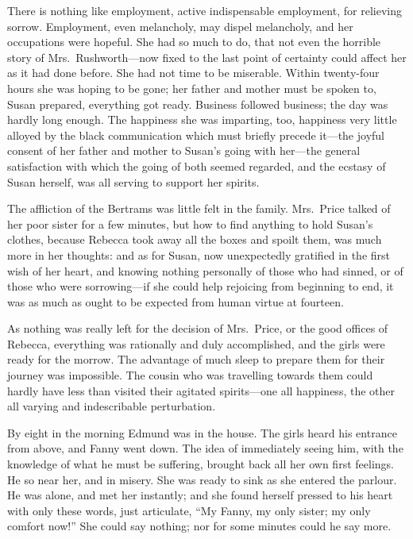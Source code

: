 There is nothing like employment, active indispensable employment,
for relieving sorrow.  Employment, even melancholy,
may dispel melancholy, and her occupations were hopeful.
She had so much to do, that not even the horrible
story of Mrs.\ Rushworth---now fixed to the last point
of certainty could affect her as it had done before.
She had not time to be miserable.  Within twenty-four
hours she was hoping to be gone; her father and mother
must be spoken to, Susan prepared, everything got ready.
Business followed business; the day was hardly long enough.
The happiness she was imparting, too, happiness very little
alloyed by the black communication which must briefly
precede it---the joyful consent of her father and mother
to Susan's going with her---the general satisfaction with
which the going of both seemed regarded, and the ecstasy
of Susan herself, was all serving to support her spirits.

The affliction of the Bertrams was little felt in the family.
Mrs.\ Price talked of her poor sister for a few minutes,
but how to find anything to hold Susan's clothes,
because Rebecca took away all the boxes and spoilt them,
was much more in her thoughts:  and as for Susan,
now unexpectedly gratified in the first wish of her heart,
and knowing nothing personally of those who had sinned,
or of those who were sorrowing---if she could help rejoicing
from beginning to end, it was as much as ought to be expected
from human virtue at fourteen.

As nothing was really left for the decision of Mrs.\ Price,
or the good offices of Rebecca, everything was rationally
and duly accomplished, and the girls were ready for
the morrow.  The advantage of much sleep to prepare
them for their journey was impossible.  The cousin
who was travelling towards them could hardly have less
than visited their agitated spirits---one all happiness,
the other all varying and indescribable perturbation.

By eight in the morning Edmund was in the house.  The girls
heard his entrance from above, and Fanny went down.
The idea of immediately seeing him, with the knowledge
of what he must be suffering, brought back all her own
first feelings.  He so near her, and in misery.  She was
ready to sink as she entered the parlour.  He was alone,
and met her instantly; and she found herself pressed
to his heart with only these words, just articulate,
``My Fanny, my only sister; my only comfort now!''
She could say nothing; nor for some minutes could he
say more.


